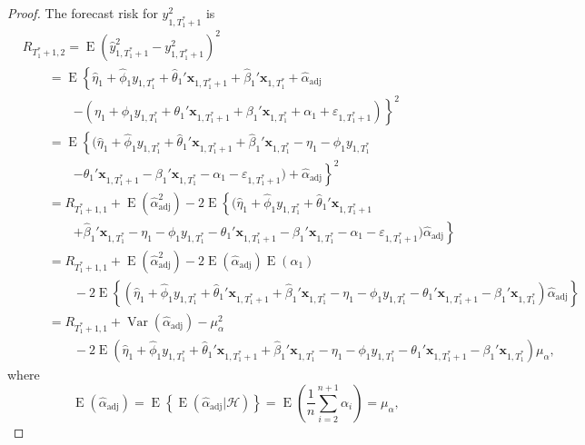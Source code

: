 \documentclass[11pt]{article}
\newcommand{\x}{\textbf{x}}
\newcommand{\Hist}{\mathcal{H}}
\DeclareMathOperator{\E}{E}
\DeclareMathOperator{\Var}{Var}
\begin{document}
\begin{proof}
The forecast risk for $y_{1,T^*_1+1}^2$ is
\begin{align*}
  &R_{T_1^*+1, 2} = \E(\hat y_{1,T_1^*+1}^2 - y_{1,T_1^*+1}^2)^2 \\
    &\qquad= \E\left\{ \hat\eta_1 + \hat\phi_1 y_{1,T_1^*} 
      + \hat\theta_1'\x_{1,T_1^*+1} + \hat\beta_1'\x_{1,T_1^*} 
      + \hat{\alpha}_{\text{adj}}\right. \\
        &\qquad\qquad\left.- (\eta_1 + \phi_1 y_{1,T_1^*} + \theta_1'\x_{1,T_1^*+1} 
          + \beta_1'\x_{1,T_1^*} + \alpha_1 + \varepsilon_{1,T_1^*+1}) \right\}^2 \\
    &\qquad= \E\left\{ (\hat\eta_1 + \hat\phi_1 y_{1,T_1^*} + \hat\theta_1'\x_{1,T_1^*+1} 
      + \hat\beta_1'\x_{1,T_1^*} - \eta_1 - \phi_1 y_{1,T_1^*}\right. \\ 
        &\qquad\qquad\left.- \theta_1'\x_{1,T_1^*+1} - \beta_1'\x_{1,T_1^*} 
          - \alpha_1 - \varepsilon_{1,T_1^*+1}) + \hat{\alpha}_{\text{adj}} \right\}^2 \\      
    &\qquad= R_{T_1^*+1, 1} + \E(\hat{\alpha}_{\text{adj}}^2) - 2\E\left\{(\hat\eta_1 
      + \hat\phi_1 y_{1,T_1^*} + \hat\theta_1'\x_{1,T_1^*+1}\right. \\
        &\qquad\qquad\left. + \hat\beta_1'\x_{1,T_1^*} - \eta_1 - \phi_1 y_{1,T_1^*} 
          - \theta_1'\x_{1,T_1^*+1} - \beta_1'\x_{1,T_1^*} - \alpha_1 
          - \varepsilon_{1,T_1^*+1})\hat{\alpha}_{\text{adj}} \right\} \\
    &\qquad= R_{T_1^*+1, 1} + \E(\hat{\alpha}_{\text{adj}}^2) 
      - 2\E(\hat{\alpha}_{\text{adj}})\E(\alpha_1) \\
      &\qquad\qquad- 2\E\left\{(\hat\eta_1 + \hat\phi_1 y_{1,T_1^*} + \hat\theta_1'\x_{1,T_1^*+1} 
        + \hat\beta_1'\x_{1,T_1^*} - \eta_1 - \phi_1 y_{1,T_1^*} 
        - \theta_1'\x_{1,T_1^*+1} - \beta_1'\x_{1,T_1^*})\hat{\alpha}_{\text{adj}} \right\} \\
    &\qquad= R_{T_1^*+1, 1} + \Var(\hat{\alpha}_{\text{adj}}) - \mu_{\alpha}^2 \\
      &\qquad\qquad- 2\E\left(\hat\eta_1 + \hat\phi_1 y_{1,T_1^*} 
        + \hat\theta_1'\x_{1,T_1^*+1} + \hat\beta_1'\x_{1,T_1^*} - \eta_1 - \phi_1 y_{1,T_1^*} 
        - \theta_1'\x_{1,T_1^*+1} - \beta_1'\x_{1,T_1^*}\right)\mu_{\alpha},
\end{align*}
where 
$$
  \E(\hat{\alpha}_{\text{adj}}) = \E\left\{\E(\hat{\alpha}_{\text{adj}}| \Hist )\right\}
    = \E\left(\frac{1}{n}\sum_{i=2}^{n+1}\alpha_i\right) 
    = \mu_{\alpha},
$$
\end{proof}
\end{document}
